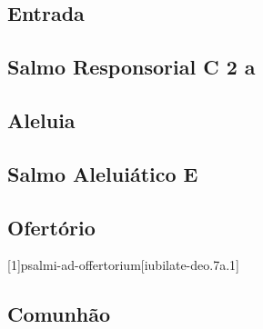 
\subsection{Entrada}\label{subsection:tempus-per-annum/missa-1/introitus}

\subsection[Salmo Responsorial]{Salmo Responsorial \textmd{C 2 a}}\label{subsection:tempus-per-annum/missa-1/psalmus-responsorius}

\AllowPageFlush

\subsection{Aleluia}\label{subsection:tempus-per-annum/missa-1/alleluia}

\subsection[Salmo Aleluiático]{Salmo Aleluiático \textmd{E \protect\GreStar}}\label{subsection:tempus-per-annum/missa-1/psalmus-alleluiaticus}

\subsection{Ofertório}\label{subsection:tempus-per-annum/missa-1/offertorium}
[1]{psalmi-ad-offertorium}[iubilate-deo.7a.1]

\AllowPageFlush

\subsection{Comunhão}\label{subsection:tempus-per-annum/missa-1/communio}
